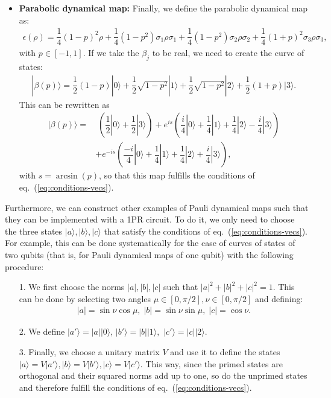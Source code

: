 \documentclass[10pt,letterpaper]{article} %
\newcommand{\eref}[1]{eq.~(\ref{#1})}
\begin{document}
\begin{itemize}
\item \textbf{Parabolic dynamical map:} Finally, we define the parabolic dynamical map as:
\begin{eqnarray}
\epsilon(\rho) = \dfrac{1}{4} (1-p)^2  \rho + \dfrac{1}{4} (1-p^2) \sigma_1 \rho \sigma_1 + \dfrac{1}{4} (1-p^2) \sigma_2 \rho \sigma_2 + \dfrac{1}{4} (1+p)^2 \sigma_3 \rho \sigma_3 ,
\end{eqnarray}
with $p \in [-1,1]$. 
If we take the $\beta_j$ to be real,
we need to create the curve of states:
\begin{eqnarray}
|\beta(p)\rangle = \dfrac{1}{2} (1-p) |0\rangle + \dfrac{1}{2} \sqrt{1-p^2} |1\rangle +  \dfrac{1}{2} \sqrt{1-p^2} |2\rangle +  \dfrac{1}{2}(1+p) |3\rangle.
\end{eqnarray}
This can be rewritten as
\begin{align*}
|\beta(p)\rangle =&\; \left( \dfrac{1}{2}|0\rangle + \dfrac{1}{2} |3\rangle \right) + e^{is} \left( \dfrac{i}{4}|0\rangle + \dfrac{1}{4} |1\rangle + \dfrac{1}{4} |2\rangle - \dfrac{i}{4} |3\rangle \right) \\
& + e^{-is}  \left( \dfrac{-i}{4} |0\rangle + \dfrac{1}{4} |1\rangle + \dfrac{1}{4} |2\rangle + \dfrac{i}{4} |3\rangle \right),
\end{align*}
with $s = \arcsin(p)$, so that
this map fulfills the conditions of  \eref{eq:conditions-vecs}.
\end{itemize}

Furthermore, we can construct other examples of 
Pauli dynamical maps such that they
can be implemented with a 1PR circuit.
To do it, we only need to choose the three states $|a\rangle, |b\rangle, |c\rangle$
that satisfy the conditions of  \eref{eq:conditions-vecs}.
For example, this can be done systematically for the case of curves of states of two qubits
(that is, for Pauli dynamical maps of one qubit)
with the following procedure:
\begin{itemize}
\item[1.] We first choose the norms $|a|, |b|, |c|$
such that $|a|^2 + |b|^2 + |c|^2 = 1$. 
This can be done by selecting two angles
$\mu \in [0, \pi/2] , \nu \in [0,\pi/2]$ and defining:
\begin{align*}
|a| = \sin \nu \cos \mu, \; |b| = \sin \nu \sin \mu , \; |c| = \cos \nu.
\end{align*}
\item[2.] We define $|a'\rangle = |a| |0\rangle$, $|b'\rangle = |b| |1\rangle,$ $|c'\rangle = |c| |2\rangle$.
\item[3.] Finally, we choose a unitary matrix $V$
and use it to define the states $|a\rangle = V |a'\rangle, |b\rangle = V |b'\rangle, |c\rangle = V |c'\rangle$.
This way, since the primed states are orthogonal and their squared norms add up to one,
so do the unprimed states and therefore 
fulfill the conditions of  \eref{eq:conditions-vecs}. 
\end{itemize}
\end{document}

